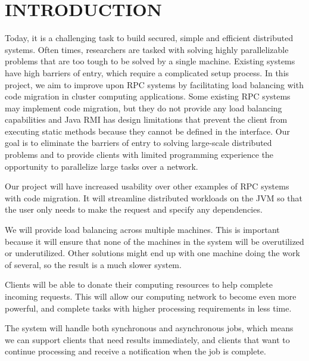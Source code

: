 \section{INTRODUCTION}\label{sec:introduction}


Today, it is a challenging task to build secured, simple and efficient distributed
systems. Often times, researchers are tasked with solving highly parallelizable problems
that are too tough to be solved by a single machine. Existing systems have
high barriers of entry, which require a complicated setup process. In this project,
we aim to improve upon RPC systems by facilitating load balancing with code
migration in cluster computing applications. Some existing RPC systems may implement
code migration, but they do not provide any load balancing capabilities
and Java RMI has design limitations that prevent the client from executing static
methods because they cannot be defined in the interface. Our goal is to eliminate
the barriers of entry to solving large-scale distributed problems and to provide
clients with limited programming experience the opportunity to parallelize large
tasks over a network.

Our project will have increased usability over other examples of RPC systems with code migration. It will streamline distributed workloads on the JVM so that the user only needs to make the request and specify any dependencies.

We will provide load balancing across multiple machines. This is important because it will ensure that none of the machines in the system will be overutilized or underutilized. Other solutions might end up with one machine doing the work of several, so the result is a much slower system.

Clients will be able to donate their computing resources to help complete incoming requests. This will allow our computing network to become even more powerful, and complete tasks with higher processing requirements in less time.

The system will handle both synchronous and asynchronous jobs, which means we can support clients that need results immediately, and clients that want to continue processing and receive a notification when the job is complete.
